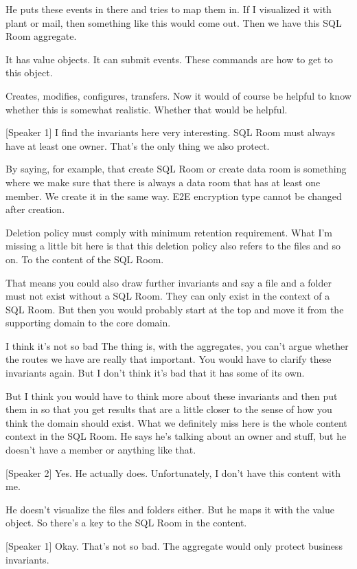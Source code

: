 He puts these events in there and tries to map them in. If I visualized it with plant or mail, then something like this would come out. Then we have this SQL Room aggregate.

It has value objects. It can submit events. These commands are how to get to this object.

Creates, modifies, configures, transfers. Now it would of course be helpful to know whether this is somewhat realistic. Whether that would be helpful.

[Speaker 1]
I find the invariants here very interesting. SQL Room must always have at least one owner. That's the only thing we also protect.

By saying, for example, that create SQL Room or create data room is something where we make sure that there is always a data room that has at least one member. We create it in the same way. E2E encryption type cannot be changed after creation.

Deletion policy must comply with minimum retention requirement. What I'm missing a little bit here is that this deletion policy also refers to the files and so on. To the content of the SQL Room.

That means you could also draw further invariants and say a file and a folder must not exist without a SQL Room. They can only exist in the context of a SQL Room. But then you would probably start at the top and move it from the supporting domain to the core domain.

I think it's not so bad The thing is, with the aggregates, you can't argue whether the routes we have are really that important. You would have to clarify these invariants again. But I don't think it's bad that it has some of its own.

But I think you would have to think more about these invariants and then put them in so that you get results that are a little closer to the sense of how you think the domain should exist. What we definitely miss here is the whole content context in the SQL Room. He says he's talking about an owner and stuff, but he doesn't have a member or anything like that.

[Speaker 2]
Yes. He actually does. Unfortunately, I don't have this content with me.

He doesn't visualize the files and folders either. But he maps it with the value object. So there's a key to the SQL Room in the content.

[Speaker 1]
Okay. That's not so bad. The aggregate would only protect business invariants.

